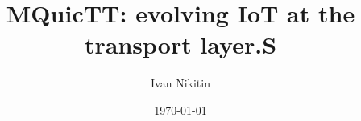 \documentclass{l4proj}
\begin{document}
\makeatletter
\patchcmd{\NAT@test}{\else \NAT@nm}{\else \NAT@nmfmt{\NAT@nm}}{}{}

\DeclareRobustCommand\citepos
{\begingroup
    \let\NAT@nmfmt\NAT@posfmt
    \NAT@swafalse\let\NAT@ctype\z@\NAT@partrue
    \@ifstar{\NAT@fulltrue\NAT@citetp}{\NAT@fullfalse\NAT@citetp}}

\let\NAT@orig@nmfmt\NAT@nmfmt
\def\NAT@posfmt#1{
    \StrRemoveBraces{#1}[\NAT@temp]
    \IfEndWith{\NAT@temp}{s}
    {\NAT@orig@nmfmt{#1'}}
    {\NAT@orig@nmfmt{#1's}}}

\makeatother

\title{MQuicTT: evolving IoT at the transport layer.S}
\author{Ivan Nikitin}
\date{\today}

\maketitle



\def\consentname {Ivan Nikitin} %
\def\consentdate {25 March 2022} %
\educationalconsent


\tableofcontents










\begin{appendices}
    
    
    
\end{appendices}


\end{document}

